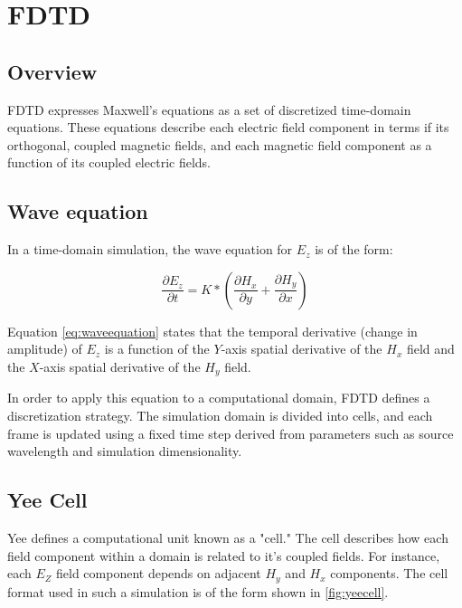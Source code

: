 
\chapter{FDTD} \label{ch:fdtd}


\section{Overview}

FDTD expresses Maxwell's equations as a set of discretized time-domain equations\cite{Yee}. These equations describe each electric field component in terms if its orthogonal, coupled magnetic fields, and each magnetic field component as a function of its coupled electric fields.


\section{Wave equation}

In a time-domain simulation, the wave equation for  $ E_z $ is of the form:

\begin{equation} \label{eq:waveequation} 
\frac{\partial E_z}{\partial t} = K * (\frac{\partial H_x}{\partial y} + \frac{\partial H_y}{\partial x})
\end{equation}

Equation \ref{eq:waveequation} states that the temporal derivative (change in amplitude) of $E_z$ is a function of the $Y$-axis spatial derivative of the $H_x$ field and the $X$-axis spatial derivative of the $H_y$ field.


In order to apply this equation to a computational domain, FDTD defines a discretization strategy. The simulation domain is divided into cells, and each frame is updated using a fixed time step derived from parameters such as source wavelength and simulation dimensionality.


\section{Yee Cell}

Yee \cite{Yee} defines a computational unit known as a "cell." The cell describes how each field component within a domain is related to it's coupled fields. For instance, each $E_Z$ field component depends on adjacent $H_y$ and $H_x$ components. The cell format used in such a simulation is of the form shown in \autoref{fig:yeecell}.

